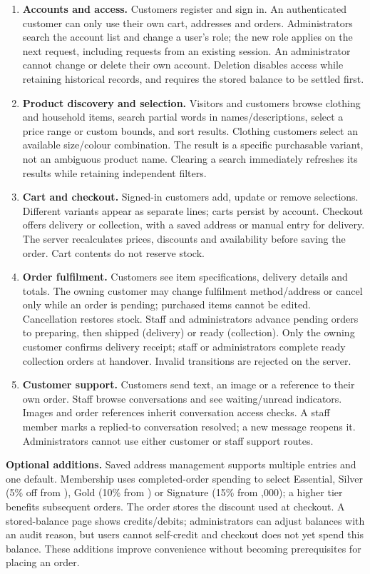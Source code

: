 \begin{enumerate}
\item \textbf{Accounts and access.} Customers register and sign in. An authenticated customer can only use their own cart, addresses and orders. Administrators search the account list and change a user's role; the new role applies on the next request, including requests from an existing session. An administrator cannot change or delete their own account. Deletion disables access while retaining historical records, and requires the stored balance to be settled first.
\item \textbf{Product discovery and selection.} Visitors and customers browse clothing and household items, search partial words in names/descriptions, select a price range or custom bounds, and sort results. Clothing customers select an available size/colour combination. The result is a specific purchasable variant, not an ambiguous product name. Clearing a search immediately refreshes its results while retaining independent filters.
\item \textbf{Cart and checkout.} Signed-in customers add, update or remove selections. Different variants appear as separate lines; carts persist by account. Checkout offers delivery or collection, with a saved address or manual entry for delivery. The server recalculates prices, discounts and availability before saving the order. Cart contents do not reserve stock.
\item \textbf{Order fulfilment.} Customers see item specifications, delivery details and totals. The owning customer may change fulfilment method/address or cancel only while an order is pending; purchased items cannot be edited. Cancellation restores stock. Staff and administrators advance pending orders to preparing, then shipped (delivery) or ready (collection). Only the owning customer confirms delivery receipt; staff or administrators complete ready collection orders at handover. Invalid transitions are rejected on the server.
\item \textbf{Customer support.} Customers send text, an image or a reference to their own order. Staff browse conversations and see waiting/unread indicators. Images and order references inherit conversation access checks. A staff member marks a replied-to conversation resolved; a new message reopens it. Administrators cannot use either customer or staff support routes.
\end{enumerate}

\textbf{Optional additions.} Saved address management supports multiple entries and one default. Membership uses completed-order spending to select Essential, Silver (5\% off from ), Gold (10\% from ) or Signature (15\% from ,000); a higher tier benefits subsequent orders. The order stores the discount used at checkout. A stored-balance page shows credits/debits; administrators can adjust balances with an audit reason, but users cannot self-credit and checkout does not yet spend this balance. These additions improve convenience without becoming prerequisites for placing an order.


